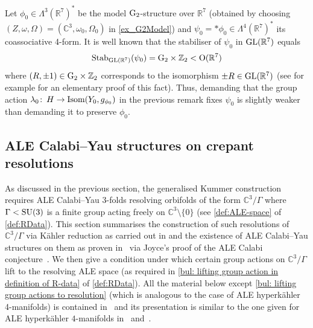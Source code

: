 \documentclass[11pt,a4paper]{scrartcl}
\newcommand{\col}{\colon \thinspace}
\newcommand{\G}{\textup{G}}
\renewcommand{\O}{\textup{O}}
\newcommand{\SU}{\textup{SU}}
\newcommand{\GL}{\textup{GL}}
\numberwithin{equation}{section}
\theoremstyle{plain}
\theoremstyle{definition}
\theoremstyle{remark}
\begin{document}
\begin{remark}\label{rem: stabiliser 4-form}
Let $\phi_0 \in \Lambda^3(\mathbb{R}^7)^*$ be the model $\G_2$-structure over $\mathbb{R}^7$ (obtained by choosing $(Z,\omega,\Omega)=(\mathbb{C}^3,\omega_0,\Omega_0)$ in \autoref{ex_G2Model}) and $\psi_0 = * \phi_0 \in \Lambda^4(\mathbb{R}^7)^*$ its coassociative 4-form. It is well known that the stabiliser of $\psi_0$ in $\GL(\mathbb{R}^7)$ equals \[\textup{Stab}_{\GL(\mathbb{R}^7)}(\psi_0) = \G_2 \times \mathbb{Z}_2 < \O(\mathbb{R}^7) \] where $(R,\pm 1) \in \G_2\times \mathbb{Z}_2$ corresponds to the isomorphism $\pm R \in \GL(\mathbb{R}^7)$ (see for example \cite[Proposition~2.1.3]{Gutwein-Diss} for an elementary proof of this fact). Thus, demanding that the group action $\lambda_0 \col H \to \textup{Isom}(Y_0,g_{\phi_0})$ in the previous remark fixes $\psi_0$ is slightly weaker than demanding it to preserve $\phi_0$.  
\end{remark}

\subsection{ALE Calabi--Yau structures on crepant resolutions}
\label{sec:Ricci-Flat ALE metrics on crepant resolutions}

As discussed in the previous section, the generalised Kummer construction requires ALE Calabi--Yau 3-folds resolving orbifolds of the form $\mathbb{C}^3/\Gamma$ where $\Gamma<\SU(3)$ is a finite group acting freely on $\mathbb{C}^3\setminus \{0\}$ (see \autoref{def:ALE-space} of \autoref{def:RData}). This section summarises the construction of such resolutions of $\mathbb{C}^3/\Gamma$ via Kähler reduction as carried out in \cite{Sardo-Infirri-ParitalResolutions} and the existence of ALE Calabi--Yau structures on them as proven in~\cite[Section~4]{WalpuskiDegeratu-HYM_on_crepant_resolutions} via Joyce's proof of the ALE Calabi conjecture~\cite[Theorem~8.2.3]{Joyce-Black}. We then give a condition under which certain group actions on $\mathbb{C}^3/\Gamma$ lift to the resolving ALE space (as required in \autoref{bul: lifting group action in definition of R-data} of \autoref{def:RData}). All the material below except \autoref{bul: lifting group actions to resolution} (which is analogous to the case of ALE hyperkähler 4-manifolds) is contained in~\cite[Sections~2,3,4]{WalpuskiDegeratu-HYM_on_crepant_resolutions} and its presentation is similar to the one given for ALE hyperkähler $4$-manifolds in~\cite[Remark~2.15]{DPSDTW-Associatives} and~\cite[Section~2.2.2]{Gutwein-coassociatives}.
\end{document}
